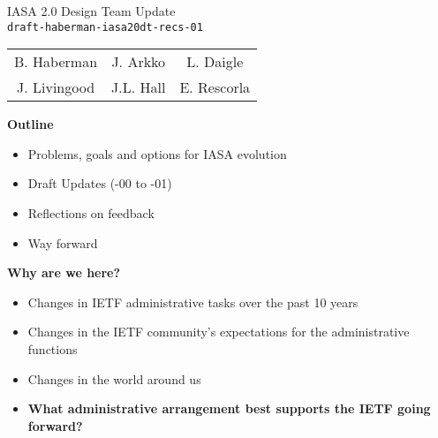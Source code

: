 \documentclass[helvetica,a4paper,landscape]{seminar}
\newcommand{\heading}[1]{%
  \begin{center} 
    \large\bf 
    #1 
  \end{center} 
  \vspace{.4 in}}
\begin{document}
\begin{slide}
\begin{center}
\vspace{.5 in}
\LARGE{{\bf}IASA 2.0 Design Team Update\\{\small \verb^draft-haberman-iasa20dt-recs-01^}}\\
\vspace{.2in}
\large{
\begin{tabular}{ c c c }
B. Haberman & J. Arkko & L. Daigle \\
J. Livingood & J.L. Hall & E. Rescorla 
\end{tabular}
}
\end{center}
\end{slide}

\centerslidesfalse 

\begin{slide}
\heading{Outline}

\begin{itemize}
\item Problems, goals and options for IASA evolution
\item Draft Updates (-00 to -01)
\item Reflections on feedback
\item Way forward
\end{itemize}

\end{slide}

\begin{slide}

\heading{Why are we here?}

{\footnotesize
\begin{itemize}
\item Changes in IETF administrative tasks over the past 10 years
\item Changes in the IETF community's expectations for the administrative functions
\item Changes in the world around us
\item \textbf{What administrative arrangement best supports the IETF going forward?}
\end{itemize}
}

\end{slide}
\end{document}
